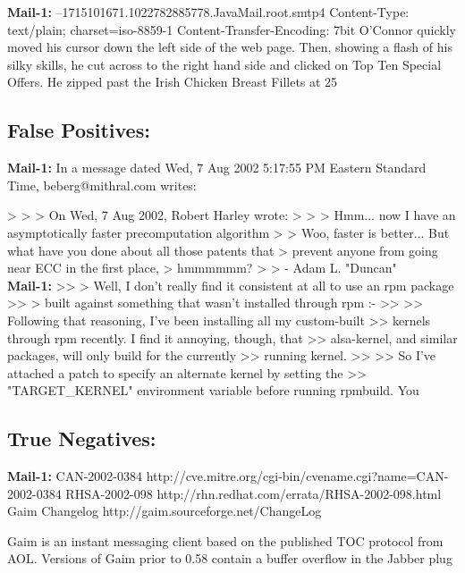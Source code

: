 \documentclass[
	letterpaper, %
	12pt, %
	unnumberedsections, %
	twoside, %
]{LTJournalArticle}
\begin{document}
\begin{appendices}
{		\noindent\textbf{Mail-1:} --1715101671.1022782885778.JavaMail.root.smtp4 Content-Type: text/plain; charset=iso-8859-1 Content-Transfer-Encoding: 7bit O'Connor quickly moved his cursor down the left side of the web page. Then, showing a flash of his silky skills, he cut across to the right hand side and clicked on Top Ten Special Offers. He zipped past the Irish Chicken Breast Fillets at 25%


	}

	\subsection{False Positives:}
	{\ttfamily \tiny
		\noindent\textbf{Mail-1:} In a message dated Wed, 7 Aug 2002 5:17:55 PM Eastern Standard Time, beberg@mithral.com writes:

		>
		>
		> On Wed, 7 Aug 2002, Robert Harley wrote:
		>
		> > Hmm... now I have an asymptotically faster precomputation algorithm
		>
		> Woo, faster is better... But what have you done about all those patents that
		> prevent anyone from going near ECC in the first place,
		> hmmmmmm?
		>
		> - Adam L. "Duncan" \\

		\noindent\textbf{Mail-1:} >> > Well, I don't really find it consistent at all to use an rpm package  >> > built against something that wasn't installed through rpm :-\/  >>  >> Following that reasoning, I've been installing all my custom-built  >> kernels through rpm recently. I find it annoying, though, that  >> alsa-kernel, and similar packages, will only build for the currently  >> running kernel.  >>  >> So I've attached a patch to specify an alternate kernel by setting the  >> "TARGET\_KERNEL" environment variable before running rpmbuild. You \\


	}

	\subsection{True Negatives:}
	{\ttfamily \tiny
		\noindent\textbf{Mail-1:} CAN-2002-0384  http://cve.mitre.org/cgi-bin/cvename.cgi?name=CAN-2002-0384
		RHSA-2002-098  http://rhn.redhat.com/errata/RHSA-2002-098.html
		Gaim Changelog http://gaim.sourceforge.net/ChangeLog

		Gaim is an instant messaging client based on the published TOC
		protocol from AOL. Versions of Gaim prior to 0.58 contain a buffer
		overflow in the Jabber plug \\

}
\end{appendices}
\end{document}

